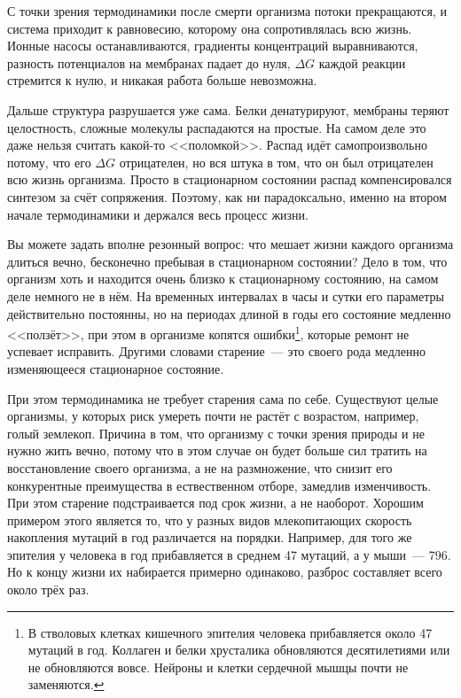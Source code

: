 С точки зрения термодинамики после смерти организма потоки прекращаются, и система приходит к равновесию, которому она сопротивлялась всю жизнь. Ионные насосы останавливаются, градиенты концентраций выравниваются, разность потенциалов на мембранах падает до нуля, $\Delta G$ каждой реакции стремится к нулю, и никакая работа больше невозможна.

Дальше структура разрушается уже сама. Белки денатурируют, мембраны теряют целостность, сложные молекулы распадаются на простые. На самом деле это даже нельзя считать какой-то <<поломкой>>. Распад идёт самопроизвольно потому, что его $\Delta G$ отрицателен, но вся штука в том, что он был отрицателен всю жизнь организма. Просто в стационарном состоянии распад компенсировался синтезом за счёт сопряжения. Поэтому, как ни парадоксально, именно на втором начале термодинамики и держался весь процесс жизни.

Вы можете задать вполне резонный вопрос: что мешает жизни каждого организма длиться вечно, бесконечно пребывая в стационарном состоянии? Дело в том, что организм хоть и находится очень близко к стационарному состоянию, на самом деле немного не в нём. На временных интервалах в часы и сутки его параметры действительно постоянны, но на периодах длиной в годы его состояние медленно <<ползёт>>, при этом в организме копятся ошибки\footnote{В стволовых клетках кишечного эпителия человека прибавляется около 47 мутаций в год. Коллаген и белки хрусталика обновляются десятилетиями или не обновляются вовсе. Нейроны и клетки сердечной мышцы почти не заменяются.}, которые ремонт не успевает исправить. Другими словами старение~--- это своего рода медленно изменяющееся стационарное состояние.

При этом термодинамика не требует старения сама по себе. Существуют целые организмы, у которых риск умереть почти не растёт с возрастом, например, голый землекоп. Причина в том, что организму с точки зрения природы и не нужно жить вечно, потому что в этом случае он будет больше сил тратить на восстановление своего организма, а не на размножение, что снизит его конкурентные преимущества в ествественном отборе, замедлив изменчивость. При этом старение подстраивается под срок жизни, а не наоборот. Хорошим примером этого является то, что у разных видов млекопитающих скорость накопления мутаций в год различается на порядки. Например, для того же эпителия у человека в год прибавляется в среднем 47 мутаций, а у мыши~--- 796. Но к концу жизни их набирается примерно одинаково, разброс составляет всего около трёх раз.


